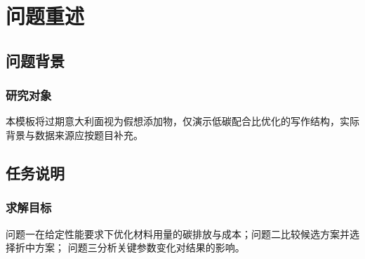 \section{问题重述}
\label{sec:problem}
\subsection{问题背景}
\subsubsection{研究对象}
本模板将过期意大利面视为假想添加物，仅演示低碳配合比优化的写作结构，实际背景与数据来源应按题目补充。

\subsection{任务说明}
\subsubsection{求解目标}
问题一在给定性能要求下优化材料用量的碳排放与成本；问题二比较候选方案并选择折中方案；
问题三分析关键参数变化对结果的影响。
